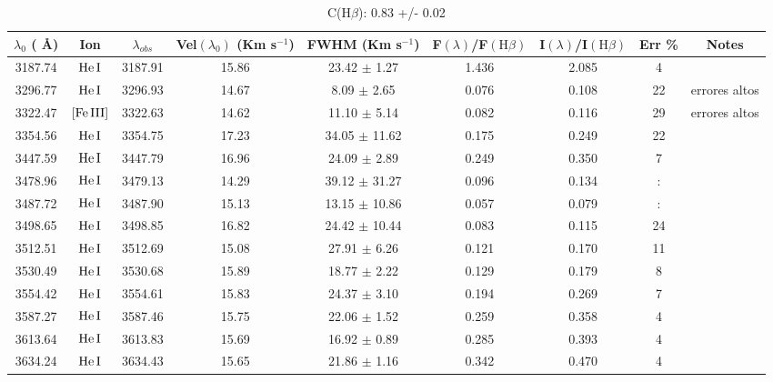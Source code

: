 \documentclass{article}
\begin{document}
\begin{table*}
\caption{C(H$\beta$): 0.83 +/- 0.02 } 
\begin{adjustbox}{width=\textwidth}
\label{}
\begin{tabular}{ccccccccc} 
\hline
$\lambda_0$ ( \AA ) & Ion & $\lambda_{obs}$ & Vel$\left( \lambda_0 \right)$ (Km s$^{-1}$) & FWHM (Km s$^{-1}$) & F$\left( \lambda \right)$/F$\left( \mbox{H}\beta \right)$ & I$\left( \lambda \right)$/I$\left( \mbox{H}\beta \right)$ & Err \% & Notes \\
\hline
3187.74 & $\mbox{He}\thinspace \mbox{I}$ & 3187.91 & 15.86 & 23.42 $\pm$ 1.27 & 1.436 & 2.085 & 4 &  \\
3296.77 & $\mbox{He}\thinspace \mbox{I}$ & 3296.93 & 14.67 & 8.09 $\pm$ 2.65 & 0.076 & 0.108 & 22 &  errores altos \\
3322.47 & $\mbox{[Fe}\thinspace \mbox{III]}$ & 3322.63 & 14.62 & 11.10 $\pm$ 5.14 & 0.082 & 0.116 & 29 &  errores altos \\
3354.56 & $\mbox{He}\thinspace \mbox{I}$ & 3354.75 & 17.23 & 34.05 $\pm$ 11.62 & 0.175 & 0.249 & 22 &  \\
3447.59 & $\mbox{He}\thinspace \mbox{I}$ & 3447.79 & 16.96 & 24.09 $\pm$ 2.89 & 0.249 & 0.350 & 7 &  \\
3478.96 & $\mbox{He}\thinspace \mbox{I}$ & 3479.13 & 14.29 & 39.12 $\pm$ 31.27 & 0.096 & 0.134 & : &  \\
3487.72 & $\mbox{He}\thinspace \mbox{I}$ & 3487.90 & 15.13 & 13.15 $\pm$ 10.86 & 0.057 & 0.079 & : &  \\
3498.65 & $\mbox{He}\thinspace \mbox{I}$ & 3498.85 & 16.82 & 24.42 $\pm$ 10.44 & 0.083 & 0.115 & 24 &  \\
3512.51 & $\mbox{He}\thinspace \mbox{I}$ & 3512.69 & 15.08 & 27.91 $\pm$ 6.26 & 0.121 & 0.170 & 11 &  \\
3530.49 & $\mbox{He}\thinspace \mbox{I}$ & 3530.68 & 15.89 & 18.77 $\pm$ 2.22 & 0.129 & 0.179 & 8 &  \\
3554.42 & $\mbox{He}\thinspace \mbox{I}$ & 3554.61 & 15.83 & 24.37 $\pm$ 3.10 & 0.194 & 0.269 & 7 &  \\
3587.27 & $\mbox{He}\thinspace \mbox{I}$ & 3587.46 & 15.75 & 22.06 $\pm$ 1.52 & 0.259 & 0.358 & 4 &  \\
3613.64 & $\mbox{He}\thinspace \mbox{I}$ & 3613.83 & 15.69 & 16.92 $\pm$ 0.89 & 0.285 & 0.393 & 4 &  \\
3634.24 & $\mbox{He}\thinspace \mbox{I}$ & 3634.43 & 15.65 & 21.86 $\pm$ 1.16 & 0.342 & 0.470 & 4 &  \\

\end{tabular}
\end{adjustbox}
\end{table*}
\end{document}
